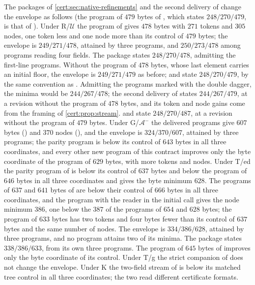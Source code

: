 The packages of \cref{cert:sec:native-refinements} and the second delivery of
 change the envelope as follows (the program of
$479$ bytes of , which states $248/270/479$, is that of
). Under
R/$\mathcal U$ the program of  gives $478$ bytes with
$271$ tokens and $305$ nodes, one token less and one node more than its control
of $479$ bytes; the envelope is $249/271/478$, attained by three programs, and
$250/273/478$ among programs reading four fields. The package states
$248/270/478$, admitting the first-line programs. Without the program of $478$
bytes, whose last element carries an initial floor, the envelope is
$249/271/479$ as before;  and 
state $248/270/479$, by the same convention as .
Admitting the programs marked with the double dagger, the minima would be
$244/267/478$; the second delivery of  states
$244/267/479$, at a revision without the program of $478$ bytes, and its
token and node gains come from the framing of \cref{cert:prop:stream}.
 and  state $248/270/487$, at a revision
without the program of $479$ bytes. Under G/$\mathcal A^{-}$ the delivered
programs give $607$ bytes () and $370$ nodes
(), and the envelope is $324/370/607$, attained by
three programs; the parity program is below its control of $643$ bytes in all
three coordinates, and every other new program of this contract improves only
the byte coordinate of the program of $629$ bytes, with more tokens and nodes.
Under T/ed the parity program of  is below its
control of $637$ bytes and below the program of $646$ bytes in all three
coordinates and gives the byte minimum $628$. The programs of $637$ and $641$
bytes of  are below their control of $666$ bytes in all
three coordinates, and the program with the reader in the initial call gives
the node minimum $386$, one below the $387$ of the programs of $654$ and $628$
bytes; the program of $633$ bytes has two tokens and four bytes fewer than its
control of $637$ bytes and the same number of nodes. The envelope is $334/386/628$, attained by three programs, and no
program attains two of its minima. The package states $338/386/633$, from its
own three programs. The program of $645$ bytes of 
improves only the byte coordinate of its control. Under T/g the strict
companion of  does not change the envelope. Under K
the two-field stream of  is below its matched tree control in
all three coordinates; the two read different certificate formats.

